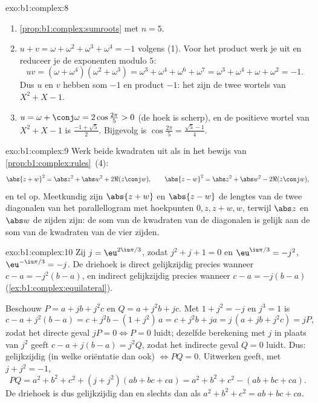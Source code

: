 \begin{solution}{exo:b1:complex:8}
\begin{enumerate}
  \item \cref{prop:b1:complex:sumroots} met $n = 5$.
  \item $u + v = \omega + \omega^2 + \omega^3 + \omega^4 = -1$ volgens
        (1). Voor het product werk je uit en reduceer je de exponenten
        modulo $5$:
        \[
        uv = (\omega + \omega^4)(\omega^2 + \omega^3)
        = \omega^3 + \omega^4 + \omega^6 + \omega^7
        = \omega^3 + \omega^4 + \omega + \omega^2 = -1 .
        \]
        Dus $u$ en $v$ hebben som $-1$ en product $-1$: het zijn de
        twee wortels van $X^2 + X - 1$.
  \item $u = \omega + \conj\omega = 2\cos\frac{2\pi}{5} > 0$ (de hoek
        is scherp), en de positieve wortel van $X^2 + X - 1$ is
        $\frac{-1 + \sqrt 5}{2}$. Bijgevolg is $\cos\frac{2\pi}{5} =
        \frac{\sqrt 5 - 1}{4}$.
\end{enumerate}
\end{solution}

\begin{solution}{exo:b1:complex:9}
Werk beide kwadraten uit als in het bewijs van
\cref{prop:b1:complex:rules}~(4):
\[
\abs{z + w}^2 = \abs z^2 + \abs w^2 + 2\Re(z\conj w),
\qquad
\abs{z - w}^2 = \abs z^2 + \abs w^2 - 2\Re(z\conj w),
\]
en tel op. Meetkundig zijn $\abs{z+w}$ en $\abs{z-w}$ de lengtes van de
twee diagonalen van het parallellogram met hoekpunten $0, z, z+w, w$,
terwijl $\abs z$ en $\abs w$ de zijden zijn: de som van de kwadraten van
de diagonalen is gelijk aan de som van de kwadraten van de vier zijden.
\end{solution}

\begin{solution}{exo:b1:complex:10}
Zij $j = \eu^{2\iu\pi/3}$, zodat $j^2 + j + 1 = 0$ en $\eu^{\iu\pi/3} =
-j^2$, $\eu^{-\iu\pi/3} = -j$. De driehoek is direct gelijkzijdig
precies wanneer $c - a = -j^2 (b - a)$, en indirect gelijkzijdig precies
wanneer $c - a = -j(b - a)$ (\cref{ex:b1:complex:equilateral}).

Beschouw $P = a + jb + j^2 c$ en $Q = a + j^2 b + jc$. Met $1 + j^2 = -j$
en $j^3 = 1$ is
\[
c - a + j^2(b - a) = c + j^2 b - (1 + j^2)\,a = c + j^2 b + ja
= j\,(a + jb + j^2 c) = jP,
\]
zodat het directe geval $jP = 0 \iff P = 0$ luidt; dezelfde berekening
met $j$ in plaats van $j^2$ geeft $c - a + j(b - a) = j^2 Q$, zodat het
indirecte geval $Q = 0$ luidt. Dus: gelijkzijdig (in welke oriëntatie
dan ook) $\iff PQ = 0$. Uitwerken geeft, met $j + j^2 = -1$,
\[
PQ = a^2 + b^2 + c^2 + (j + j^2)(ab + bc + ca)
= a^2 + b^2 + c^2 - (ab + bc + ca).
\]
De driehoek is dus gelijkzijdig dan en slechts dan als $a^2 + b^2 + c^2 =
ab + bc + ca$.
\end{solution}

